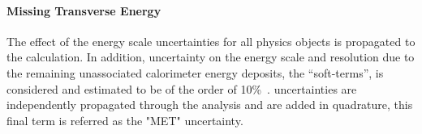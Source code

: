 \paragraph{Missing Transverse Energy}
The effect of the energy scale uncertainties for all  physics objects is propagated to the \met calculation.
In addition, uncertainty on the energy scale and resolution due to the remaining unassociated 
calorimeter energy deposits, the ``soft-terms'', is considered and estimated to be of the order of 10\%~\cite{ETMISS}. 
\met uncertainties are independently propagated through the analysis and are
added in quadrature, this final term is referred as the "MET" uncertainty.


